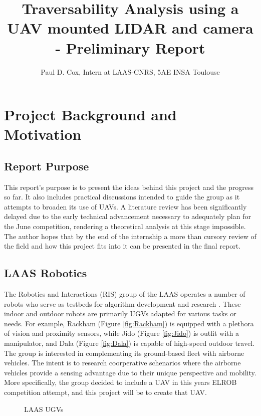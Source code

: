 \documentclass[a4paper,11pt]{report}
\title{Traversability Analysis using a UAV mounted LIDAR and camera - Preliminary Report}
\author{Paul D. Cox, Intern at LAAS-CNRS, 5AE INSA Toulouse}
\begin{document}
\maketitle

\tableofcontents
\newpage

\chapter{Project Background and Motivation}

\section{Report Purpose}

This report's purpose is to present the ideas behind this project and the progress so far. It also includes practical discussions intended to guide the group as it attempts to broaden its use of UAVs. A literature review has been significantly delayed due to the early technical advancement necessary to adequately plan for the June competition, rendering a theoretical analysis at this stage impossible. The author hopes that by the end of the internship a more than cursory review of the field and how this project fits into it can be presented in the final report.

\section{LAAS Robotics}

The Robotics and Interactions (RIS) group of the LAAS operates a number of robots who serve as testbeds for algorithm development and research \cite{ugvs}. These indoor and outdoor robots are primarily UGVs adapted for various tasks or needs. For example, Rackham (Figure \ref{fig:Rackham}) \cite{rackham} is equipped with a plethora of vision and proximity sensors, while Jido (Figure \ref{fig:Jido}) \cite{jido} is outfit with a manipulator, and Dala (Figure \ref{fig:Dala}) \cite{dala} is capable of high-speed outdoor travel. The group is interested in complementing its ground-based fleet with airborne vehicles. The intent is to research coorperative schenarios where the airborne vehicles provide a sensing advantage due to their unique perspective and mobility. More specifically, the group decided to include a UAV in this years ELROB competition attempt, and this project \cite{this} will be to create that UAV. 

\begin{figure}[htb]
  \centering
  \caption{LAAS UGVs}
  \label{fig:ugvs}
\end{figure}
\end{document}
